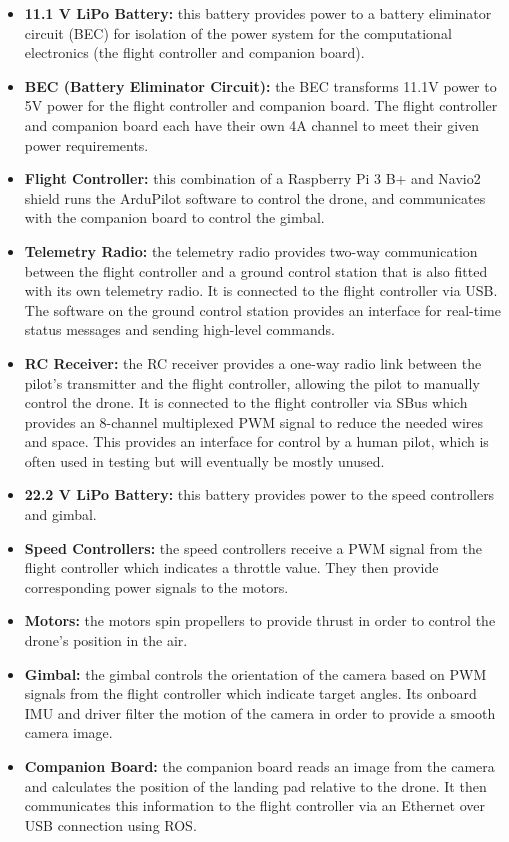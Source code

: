 \begin{itemize}
    \item \textbf{11.1 V LiPo Battery:} this battery provides power to a battery eliminator circuit (BEC) for isolation of the power system for the computational electronics (the flight controller and companion board).
    \item \textbf{BEC (Battery Eliminator Circuit):} the BEC transforms 11.1V power to 5V power for the flight controller and companion board. The flight controller and companion board each have their own 4A channel to meet their given power requirements.
    \item \textbf{Flight Controller:} this combination of a Raspberry Pi 3 B+ and Navio2 shield runs the ArduPilot software to control the drone, and communicates with the companion board to control the gimbal.
    \item \textbf{Telemetry Radio:} the telemetry radio provides two-way communication between the flight controller and a ground control station that is also fitted with its own telemetry radio. It is connected to the flight controller via USB. The software on the ground control station provides an interface for real-time status messages and sending high-level commands.
    \item \textbf{RC Receiver:} the RC receiver provides a one-way radio link between the pilot's transmitter and the flight controller, allowing the pilot to manually control the drone. It is connected to the flight controller via SBus which provides an 8-channel multiplexed PWM signal to reduce the needed wires and space. This provides an interface for control by a human pilot, which is often used in testing but will eventually be mostly unused.
    \item \textbf{22.2 V LiPo Battery:} this battery provides power to the speed controllers and gimbal.
    \item \textbf{Speed Controllers:} the speed controllers receive a PWM signal from the flight controller which indicates a throttle value. They then provide corresponding power signals to the motors.
    \item \textbf{Motors:} the motors spin propellers to provide thrust in order to control the drone's position in the air.
    \item \textbf{Gimbal:} the gimbal controls the orientation of the camera based on PWM signals from the flight controller which indicate target angles. Its onboard IMU and driver filter the motion of the camera in order to provide a smooth camera image.
    \item \textbf{Companion Board:} the companion board reads an image from the camera and calculates the position of the landing pad relative to the drone. It then communicates this information to the flight controller via an Ethernet over USB connection using ROS.

\end{itemize}

